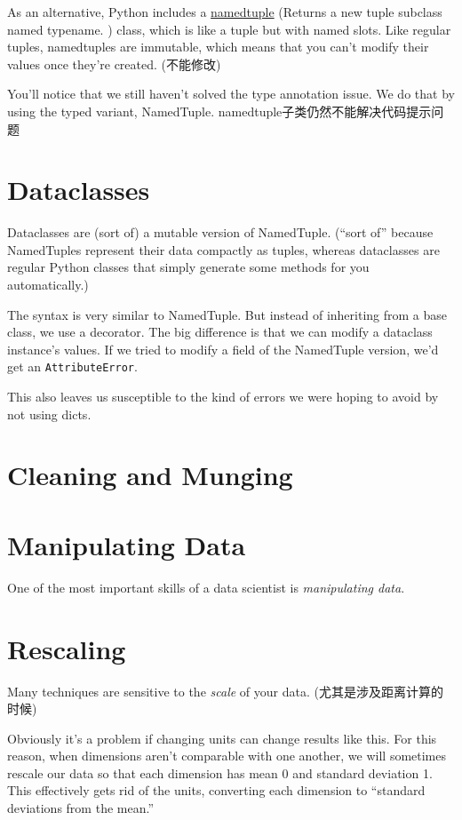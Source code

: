 As an alternative, Python includes a \href{https://docs.python.org/3/library/collections.html#collections.namedtuple}{namedtuple} (Returns a new tuple subclass named typename. ) class, which is like a tuple but with
named slots. Like regular tuples, namedtuples are immutable, which means that you can't modify
their values once they're created. (不能修改)

You'll notice that we still haven't solved the type annotation issue. We do that by using
the typed variant, NamedTuple. namedtuple子类仍然不能解决代码提示问题

\section{Dataclasses}
Dataclasses are (sort of) a mutable version of NamedTuple. (``sort of'' because
NamedTuples represent their data compactly as tuples, whereas dataclasses are regular
Python classes that simply generate some methods for you automatically.)

The syntax is very similar to NamedTuple. But instead of inheriting from a base class,
we use a decorator. The big difference is that we can modify a dataclass instance's values.
If we tried to modify a field of the NamedTuple version, we'd get an \verb|AttributeError|.

This also leaves us susceptible to the kind of errors we were hoping to avoid by not
using dicts.

\section{Cleaning and Munging}
\section{Manipulating Data}
One of the most important skills of a data scientist is \emph{manipulating data}.

\section{Rescaling}
Many techniques are sensitive to the \emph{scale} of your data. (尤其是涉及距离计算的时候)

Obviously it's a problem if changing units can change results like this. For this reason,
when dimensions aren't comparable with one another, we will sometimes rescale our
data so that each dimension has mean 0 and standard deviation 1. This effectively
gets rid of the units, converting each dimension to ``standard deviations from the
mean.''

